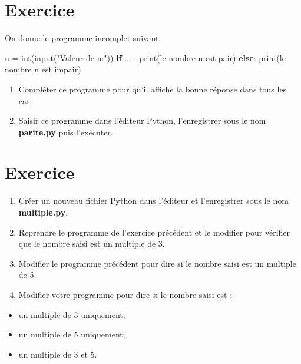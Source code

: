 \documentclass[11pt]{article}
\providecommand{\tightlist}{%
      \setlength{\itemsep}{0pt}\setlength{\parskip}{0pt}}
\newenvironment{Shaded}{}{}
\newcommand{\StringTok}[1]{\textcolor[rgb]{0.25,0.44,0.63}{{#1}}}
\newcommand{\NormalTok}[1]{{#1}}
\newcommand{\ControlFlowTok}[1]{\textcolor[rgb]{0.00,0.44,0.13}{\textbf{{#1}}}}
\newcommand{\OperatorTok}[1]{\textcolor[rgb]{0.40,0.40,0.40}{{#1}}}
\newcommand{\BuiltInTok}[1]{{#1}}
\begin{document}
    \hypertarget{exercice}{%
\section{Exercice}\label{exercice}}

On donne le programme incomplet suivant:

\begin{Shaded}
\begin{Highlighting}[]
\NormalTok{n }\OperatorTok{=} \BuiltInTok{int}\NormalTok{(}\BuiltInTok{input}\NormalTok{(}\StringTok{"Valeur de n:"}\NormalTok{))}
\ControlFlowTok{if}\NormalTok{ ... :}
    \BuiltInTok{print}\NormalTok{(}\StringTok{\textquotesingle{}le nombre n est pair\textquotesingle{}}\NormalTok{)}
\ControlFlowTok{else}\NormalTok{:}
    \BuiltInTok{print}\NormalTok{(}\StringTok{\textquotesingle{}le nombre n est impair\textquotesingle{}}\NormalTok{)}
\end{Highlighting}
\end{Shaded}

\begin{enumerate}
\def\labelenumi{\arabic{enumi}.}
\tightlist
\item
  Compléter ce programme pour qu'il affiche la bonne réponse dans tous
  les cas.
\item
  Saisir ce programme dans l'éditeur Python, l'enregistrer sous le nom
  \textbf{parite.py} puis l'exécuter.
\end{enumerate}

    \hypertarget{exercice}{%
\section{Exercice}\label{exercice}}

\begin{enumerate}
\def\labelenumi{\arabic{enumi}.}
\tightlist
\item
  Créer un nouveau fichier Python dans l'éditeur et l'enregistrer sous
  le nom \textbf{multiple.py}.
\item
  Reprendre le programme de l'exercice précédent et le modifier pour
  vérifier que le nombre saisi est un multiple de 3.
\item
  Modifier le programme précédent pour dire si le nombre saisi est un
  multiple de 5.
\item
  Modifier votre programme pour dire si le nombre saisi est :
\end{enumerate}

\begin{itemize}
\tightlist
\item
  un multiple de 3 uniquement;
\item
  un multiple de 5 uniquement;
\item
  un multiple de 3 et 5.
\end{itemize}
\end{document}
